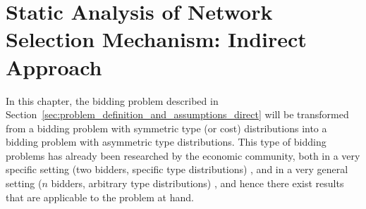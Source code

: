 \chapter{Static Analysis of Network Selection Mechanism: Indirect Approach}
\label{cha:indirect}

\minitoc
\vspace{10mm}

In this chapter, the bidding problem described in Section~\ref{sec:problem_definition_and_assumptions_direct} will be transformed from a bidding problem with symmetric type (or cost) distributions into a bidding problem with asymmetric type distributions. This type of bidding problems has already been researched by the economic community, both in a very specific setting (two bidders, specific type distributions) \cite{KaplanZamir2007,MaskinRiley2000}, and in a very general setting ($n$ bidders, arbitrary type distributions) \cite{Lebrun1999,Lebrun2006}, and hence there exist results that are applicable to the problem at hand.

